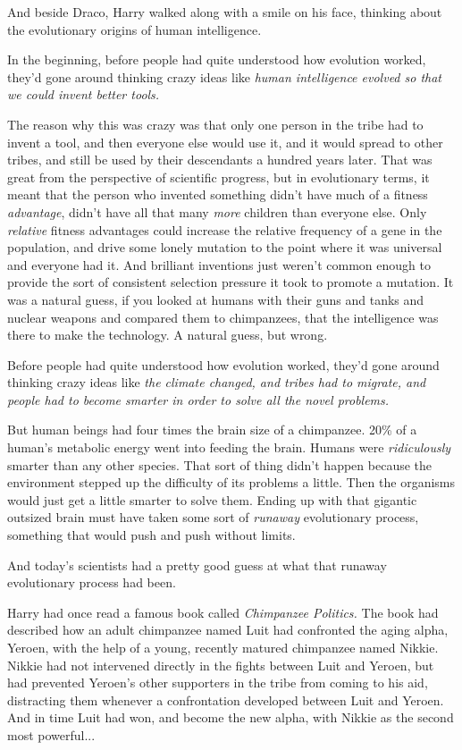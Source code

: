 And beside Draco, Harry walked along with a smile on his face, thinking
about the evolutionary origins of human intelligence.

In the beginning, before people had quite understood how evolution
worked, they'd gone around thinking crazy ideas like \emph{human
intelligence evolved so that we could invent better tools.}

The reason why this was crazy was that only one person in the tribe had
to invent a tool, and then everyone else would use it, and it would
spread to other tribes, and still be used by their descendants a hundred
years later. That was great from the perspective of scientific progress,
but in evolutionary terms, it meant that the person who invented
something didn't have much of a fitness \emph{advantage}, didn't have
all that many \emph{more} children than everyone else. Only
\emph{relative} fitness advantages could increase the relative frequency
of a gene in the population, and drive some lonely mutation to the point
where it was universal and everyone had it. And brilliant inventions
just weren't common enough to provide the sort of consistent selection
pressure it took to promote a mutation. It was a natural guess, if you
looked at humans with their guns and tanks and nuclear weapons and
compared them to chimpanzees, that the intelligence was there to make
the technology. A natural guess, but wrong.

Before people had quite understood how evolution worked, they'd gone
around thinking crazy ideas like \emph{the climate changed, and tribes
had to migrate, and people had to become smarter in order to solve all
the novel problems.}

But human beings had four times the brain size of a chimpanzee. 20\% of
a human's metabolic energy went into feeding the brain. Humans were
\emph{ridiculously} smarter than any other species. That sort of thing
didn't happen because the environment stepped up the difficulty of its
problems a little. Then the organisms would just get a little smarter to
solve them. Ending up with that gigantic outsized brain must have taken
some sort of \emph{runaway} evolutionary process, something that would
push and push without limits.

And today's scientists had a pretty good guess at what that runaway
evolutionary process had been.

Harry had once read a famous book called \emph{Chimpanzee Politics.} The
book had described how an adult chimpanzee named Luit had confronted the
aging alpha, Yeroen, with the help of a young, recently matured
chimpanzee named Nikkie. Nikkie had not intervened directly in the
fights between Luit and Yeroen, but had prevented Yeroen's other
supporters in the tribe from coming to his aid, distracting them
whenever a confrontation developed between Luit and Yeroen. And in time
Luit had won, and become the new alpha, with Nikkie as the second most
powerful...

